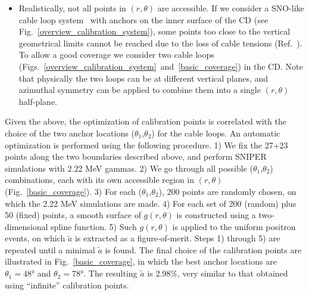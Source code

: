\documentclass[a4paper,10pt,twoside]{cpc-hepnp}
\begin{document}
\begin{CJK*}{GB}{gbsn}
\begin{multicols}{2}
\begin{itemize}
\item Realistically, not all points in $(r,\theta)$ are accessible. If
  we consider a SNO-like cable loop system~\cite{SNO} with anchors on
  the inner surface of the CD (see
  Fig.~\ref{overview_calibration_system}), some points too close to
  the vertical geometrical limits cannot be reached due to the loss of
  cable tensions (Ref.~\cite{zhangyuanyuan-new-paper}). To allow a
  good coverage we consider two cable loops
  (Figs.~\ref{overview_calibration_system}~and~\ref{basic_coverage}) in the
  CD. Note that physically the two loops can be at different vertical
  planes, and azimuthal symmetry can be applied to combine them into a
  single $(r,\theta)$ half-plane.
\end{itemize}

Given the above, the optimization of calibration points is correlated
with the choice of the two anchor locations ($\theta_1$,$\theta_2$)
for the cable loops. An automatic optimization is performed using the
following procedure. 1) We fix the 27+23 points along the two
boundaries described above, and perform SNIPER simulations with 2.22
MeV gammas. 2) We go through all possible ($\theta_1$,$\theta_2$)
combinations, each with its own accessible region in $(r,\theta)$
(Fig.~\ref{basic_coverage}). 3) For each ($\theta_1$,$\theta_2$), 200
points are randomly chosen, on which the 2.22 MeV simulations are
made. 4) For each set of 200 (random) plus 50 (fixed) points, a smooth
surface of $g(r,\theta)$ is constructed using a two-dimensional
spline function. 5) Such $g(r,\theta)$ is applied to the uniform
positron events, on which $\tilde{a}$ is extracted as a
figure-of-merit. Steps 1) through 5) are repeated until a minimal
$\tilde{a}$ is found. The final choice of the calibration points are
illustrated in Fig.~\ref{basic_coverage}, in which the best anchor
locations are $\theta_1=\ang{48}$ and $\theta_2=\ang{78}$.  The
resulting $\tilde{a}$ is 2.98\%, very similar to that obtained using
``infinite'' calibration points.


\end{multicols}
\end{CJK*}
\end{document}

